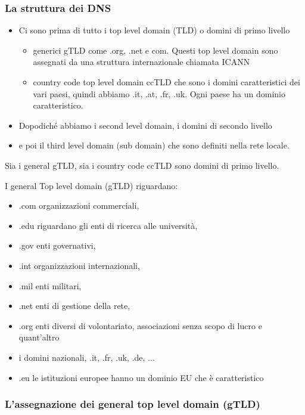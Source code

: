 \subsubsection{La struttura dei DNS}

\begin{itemize}
    \item Ci sono prima di tutto i top level domain (TLD) o domini di primo livello
          \begin{itemize}
              \item generici gTLD come .org, .net e com. Questi top level domain sono assegnati da una struttura internazionale chiamata ICANN
              \item country code top level domain ccTLD che sono i domini caratteristici dei vari paesi, quindi abbiamo .it, .at, .fr, .uk. Ogni paese ha un dominio caratteristico.
          \end{itemize}
    \item Dopodiché abbiamo i second level domain, i domini di secondo livello
    \item e poi il third level domain  (sub domain) che sono definiti nella rete locale.
\end{itemize}

Sia i general gTLD, sia i country code ccTLD sono domini di primo livello. \par

I general Top level domain (gTLD) riguardano:
\begin{itemize}
    \item .com organizzazioni commerciali,
    \item .edu riguardano gli enti di ricerca alle università,
    \item .gov enti governativi,
    \item .int organizzazioni internazionali,
    \item .mil enti militari,
    \item .net enti di gestione della rete,
    \item .org enti diversi di volontariato, associazioni senza scopo di lucro e quant'altro
    \item i domini nazionali, .it, .fr, .uk, .de, ...
    \item .eu le istituzioni europee hanno un dominio EU che è caratteristico
\end{itemize}

\subsubsection{L'assegnazione dei general top level domain (gTLD)}

